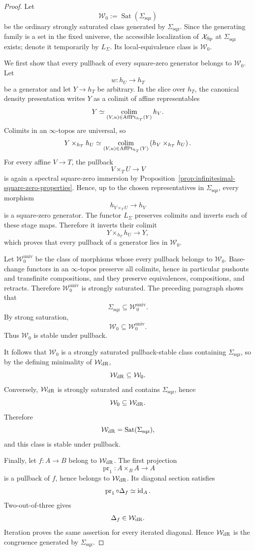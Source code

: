 \begin{proof}
Let
\[
    \mathcal W_0:=\operatorname{Sat}(\Sigma_{\mathrm{sqz}})
\]
be the ordinary strongly saturated class generated by
$\Sigma_{\mathrm{sqz}}$.  Since the generating family is a set in the fixed
universe, the accessible localization of $\mathcal X_{\mathrm{Sp}}$ at
$\Sigma_{\mathrm{sqz}}$ exists; denote it temporarily by $L_\Sigma$.  Its
local-equivalence class is $\mathcal W_0$.

We first show that every pullback of every square-zero generator belongs to
$\mathcal W_0$.  Let
\[
    w:h_U\longrightarrow h_T
\]
be a generator and let $Y\to h_T$ be arbitrary.  In the slice over $h_T$,
the canonical density presentation writes $Y$ as a colimit of affine
representables
\[
    Y\simeq\operatorname*{colim}_{(V,u)\in\operatorname{AffPt}_{h_T}(Y)}h_V.
\]
Colimits in an $\infty$-topos are universal, so
\[
    Y\times_{h_T}h_U
    \simeq
    \operatorname*{colim}_{(V,u)\in\operatorname{AffPt}_{h_T}(Y)}
    \left(h_V\times_{h_T}h_U\right).
\]
For every affine $V\to T$, the pullback
\[
    V\times_TU\longrightarrow V
\]
is again a spectral square-zero immersion by
Proposition~\ref{prop:infinitesimal-square-zero-properties}.  Hence, up to
the chosen representatives in $\Sigma_{\mathrm{sqz}}$, every morphism
\[
    h_{V\times_TU}\longrightarrow h_V
\]
is a square-zero generator.  The functor $L_\Sigma$ preserves colimits and
inverts each of these stage maps.  Therefore it inverts their colimit
\[
    Y\times_{h_T}h_U\longrightarrow Y,
\]
which proves that every pullback of a generator lies in $\mathcal W_0$.

Let $\mathcal W_0^{\mathrm{univ}}$ be the class of morphisms whose every
pullback belongs to $\mathcal W_0$.  Base-change functors in an
$\infty$-topos preserve all colimits, hence in particular pushouts and
transfinite compositions, and they preserve equivalences, compositions, and
retracts.  Therefore $\mathcal W_0^{\mathrm{univ}}$ is strongly
saturated.  The preceding
paragraph shows that
\[
    \Sigma_{\mathrm{sqz}}\subseteq\mathcal W_0^{\mathrm{univ}}.
\]
By strong saturation,
\[
    \mathcal W_0
    \subseteq
    \mathcal W_0^{\mathrm{univ}}.
\]
Thus $\mathcal W_0$ is stable under pullback.

It follows that $\mathcal W_0$ is a strongly saturated pullback-stable class
containing $\Sigma_{\mathrm{sqz}}$, so by the defining minimality of
$\mathcal W_{\mathrm{dR}}$,
\[
    \mathcal W_{\mathrm{dR}}\subseteq\mathcal W_0.
\]
Conversely, $\mathcal W_{\mathrm{dR}}$ is strongly saturated and contains
$\Sigma_{\mathrm{sqz}}$, hence
\[
    \mathcal W_0\subseteq\mathcal W_{\mathrm{dR}}.
\]
Therefore
\[
    \mathcal W_{\mathrm{dR}}
    =
    \operatorname{Sat}(\Sigma_{\mathrm{sqz}}),
\]
and this class is stable under pullback.

Finally, let $f:A\to B$ belong to $\mathcal W_{\mathrm{dR}}$.  The first projection
\[
    \operatorname{pr}_1:A\times_BA\longrightarrow A
\]
is a pullback of $f$, hence belongs to $\mathcal W_{\mathrm{dR}}$.  Its diagonal
section satisfies
\[
    \operatorname{pr}_1\circ\Delta_f\simeq\operatorname{id}_A.
\]
Two-out-of-three gives
\[
    \Delta_f\in\mathcal W_{\mathrm{dR}}.
\]
Iteration proves the same assertion for every iterated diagonal.  Hence
$\mathcal W_{\mathrm{dR}}$ is the congruence generated by
$\Sigma_{\mathrm{sqz}}$.
\end{proof}

